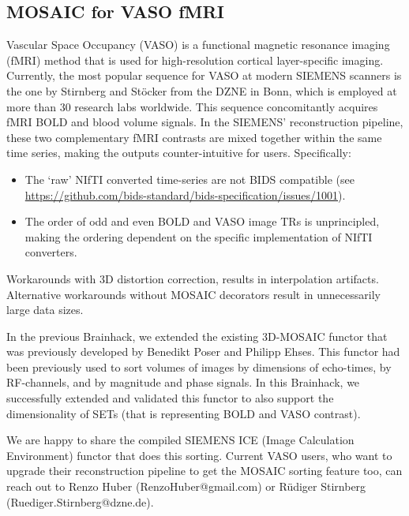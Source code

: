 \documentclass[../main.tex]{subfiles}
\begin{document}
\subsection{MOSAIC for VASO fMRI}\label{sec:vasomosaic}


Vascular Space Occupancy (VASO) is a functional magnetic resonance imaging (fMRI) method that is used for high-resolution cortical layer-specific imaging\cite{Huber2021a}. Currently, the most popular sequence for VASO at modern SIEMENS scanners is the one by Stirnberg and St\"ocker\cite{Stirnberg2021a} from the DZNE in Bonn, which is employed at more than 30 research labs worldwide. This sequence concomitantly acquires fMRI BOLD and blood volume signals. In the SIEMENS' reconstruction pipeline, these two complementary fMRI contrasts are mixed together within the same time series, making the outputs counter-intuitive for users. Specifically:

\begin{itemize}
    \item The `raw' NIfTI converted time-series are not BIDS compatible (see \url{https://github.com/bids-standard/bids-specification/issues/1001}).
    
    \item The order of odd and even BOLD and VASO image TRs is unprincipled, making the ordering dependent on the specific implementation of NIfTI converters.
\end{itemize}

Workarounds with 3D distortion correction, results in interpolation artifacts. Alternative workarounds without MOSAIC decorators result in unnecessarily large data sizes.

In the previous Brainhack\cite{Gau2021}, we extended the existing 3D-MOSAIC functor that was previously developed by Benedikt Poser and Philipp Ehses. This functor had been previously used to sort volumes of images by dimensions of echo-times, by RF-channels, and by magnitude and phase signals. In this Brainhack, we successfully extended and validated this functor to also support the dimensionality of SETs (that is representing BOLD and VASO contrast).

We are happy to share the compiled SIEMENS ICE (Image Calculation Environment) functor that does this sorting. Current VASO users, who want to upgrade their reconstruction pipeline to get the MOSAIC sorting feature too, can reach out to Renzo Huber (RenzoHuber@gmail.com) or R\"udiger Stirnberg (Ruediger.Stirnberg@dzne.de).
\end{document}
